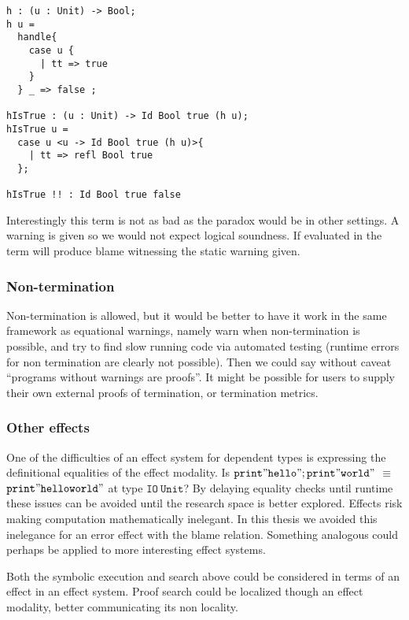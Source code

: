 \begin{lstlisting}[basicstyle={\ttfamily}]
h : (u : Unit) -> Bool;
h u =
  handle{
    case u {
      | tt => true
    }
  } _ => false ;

hIsTrue : (u : Unit) -> Id Bool true (h u);
hIsTrue u =
  case u <u -> Id Bool true (h u)>{
    | tt => refl Bool true
  };

hIsTrue !! : Id Bool true false
\end{lstlisting}

Interestingly this term is not as bad as the paradox would be in other settings.
A warning is given so we would not expect logical soundness.
If evaluated in \whnf{} the term will produce blame witnessing the static warning given.


\subsubsection{Non-termination}

Non-termination is allowed, but it would be better to have it work in the same framework as equational warnings, namely warn when non-termination is possible, and try to find slow running code via automated testing (runtime errors for non termination are clearly not possible).
Then we could say without caveat ``programs without warnings are proofs''.
It might be possible for users to supply their own external proofs of termination\cite{casinghino2014combining}, or termination metrics.

\subsubsection{Other effects}

One of the difficulties of an effect system for dependent types is expressing the definitional equalities of the effect modality.
Is $\mathtt{print"hello";print"world"}$ $\equiv$ $\mathtt{print"helloworld"}$ at type $\mathtt{IO\ Unit}$?
By delaying equality checks until runtime these issues can be avoided until the research space is better explored.
Effects risk making computation mathematically inelegant.
In this thesis we avoided this inelegance for an error effect with the blame relation.
Something analogous could perhaps be applied to more interesting effect systems.

Both the symbolic execution and search above could be considered in terms of an effect in an effect system. 
Proof search could be localized though an effect modality, better communicating its non locality.


